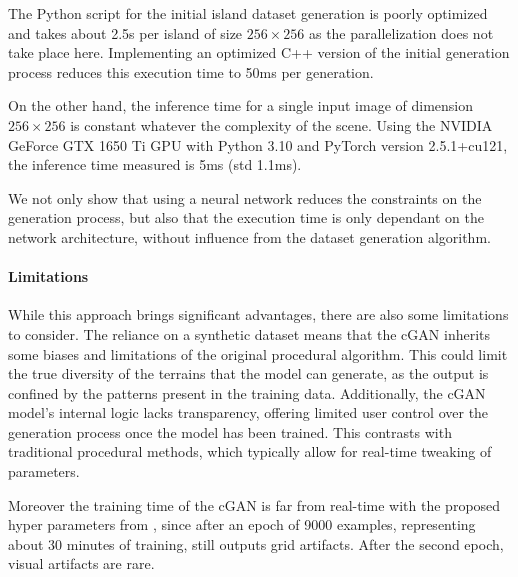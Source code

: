 \documentclass{egpubl}
\begin{document}

The Python script for the initial island dataset generation is poorly optimized and takes about 2.5s per island of size $256 \times 256$ as the parallelization does not take place here. Implementing an optimized C++ version of the initial generation process reduces this execution time to 50ms per generation.

On the other hand, the inference time for a single input image of dimension $256 \times 256$ is constant whatever the complexity of the scene. Using the NVIDIA GeForce GTX 1650 Ti GPU with Python 3.10 and PyTorch version 2.5.1+cu121, the inference time measured is 5ms (std 1.1ms). 

We not only show that using a neural network reduces the constraints on the generation process, but also that the execution time is only dependant on the network architecture, without influence from the dataset generation algorithm. 





\paragraph{Limitations} 
While this approach brings significant advantages, there are also some limitations to consider. The reliance on a synthetic dataset means that the cGAN inherits some biases and limitations of the original procedural algorithm. This could limit the true diversity of the terrains that the model can generate, as the output is confined by the patterns present in the training data. Additionally, the cGAN model's internal logic lacks transparency, offering limited user control over the generation process once the model has been trained. This contrasts with traditional procedural methods, which typically allow for real-time tweaking of parameters.

Moreover the training time of the cGAN is far from real-time with the proposed hyper parameters from \cite{Isola2017}, since after an epoch of 9000 examples, representing about 30 minutes of training, still outputs grid artifacts. After the second epoch, visual artifacts are rare. 
\end{document}
